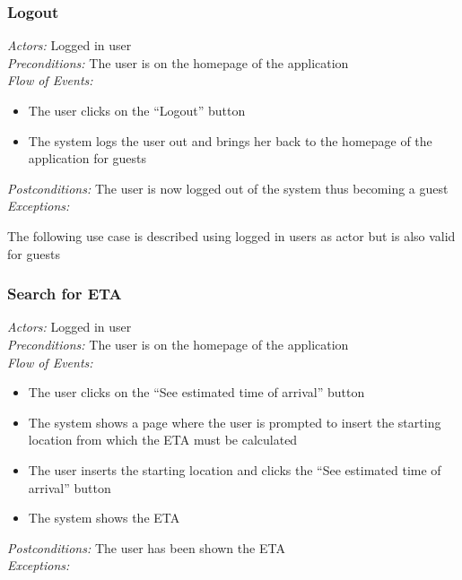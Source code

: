 \documentclass{article}
\begin{document}
\subsubsection{Logout}
\textit{Actors:} Logged in user
\\\textit{Preconditions:} The user is on the homepage of the application
\\\textit{Flow of Events:}
\begin{itemize}
	\item  The user clicks on the ``Logout'' button
	\item  The system logs the user out and brings her back to the homepage of the application for guests
\end{itemize}
\textit{Postconditions:} The user is now logged out of the system thus becoming a guest
\\\textit{Exceptions:}

The following use case is described using logged in users as actor but is also valid for guests
\subsubsection{Search for ETA}
\textit{Actors:} Logged in user
\\\textit{Preconditions:} The user is on the homepage of the application
\\\textit{Flow of Events:}
\begin{itemize}
	\item  The user clicks on the ``See estimated time of arrival'' button
	\item  The system shows a page where the user is prompted to insert the starting location from which the ETA must be calculated
	\item  The user inserts the starting location and clicks the ``See estimated time of arrival'' button
	\item  The system shows the ETA 
\end{itemize}
\textit{Postconditions:} The user has been shown the ETA
\\\textit{Exceptions:}
\end{document}
